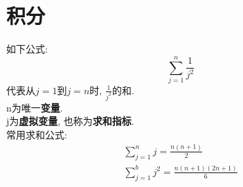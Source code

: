 \chapter{积分}
如下公式:\\
\[\sum_{j=1}^n\frac{1}{j^2}\]
代表从$j=1$到$j=n$时, $\displaystyle\frac{1}{j^2}$的和.\\
n为唯一\textbf{变量}.\\
j为\textbf{虚拟变量}, 也称为\textbf{求和指标}.\\[2ex]

常用求和公式:
\begin{gather}
\sum_{j=1}^n j=\frac{n(n+1)}{2}\\
\sum_{j=1}^b j^2=\frac{n(n+1)(2n+1)}{6}
\end{gather}
